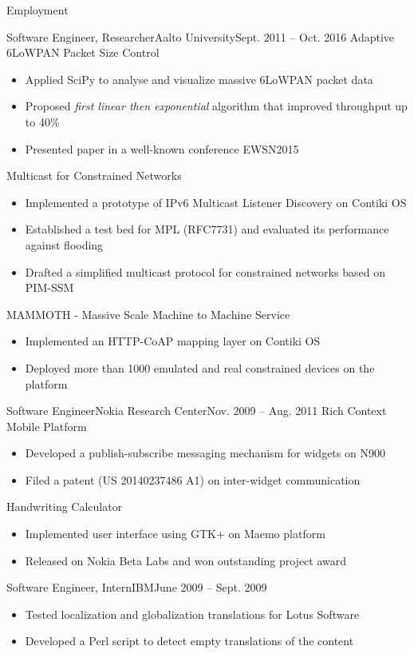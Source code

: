 \documentclass[print]{mcdowellcv}
\begin{document}
\begin{cvsection}{Employment}
		\begin{cvsubsection}{Software Engineer, Researcher}{Aalto University}{Sept. 2011 -- Oct. 2016}
			Adaptive 6LoWPAN Packet Size Control
			\begin{itemize}
				\item Applied SciPy to analyse and visualize massive 6LoWPAN packet data
				\item Proposed \textit{first linear then exponential} algorithm that improved throughput up to 40\%
				\item Presented paper in a well-known conference EWSN2015
			\end{itemize}
			\smallskip
			Multicast for Constrained Networks
			\begin{itemize}
				\item Implemented a prototype of IPv6 Multicast Listener Discovery on Contiki OS
				\item Established a test bed for MPL (RFC7731) and evaluated its performance against flooding 
				\item Drafted a simplified multicast protocol for constrained networks based on PIM-SSM
			\end{itemize}
			\smallskip
			MAMMOTH - Massive Scale Machine to Machine Service
			\begin{itemize}
				\item Implemented an HTTP-CoAP mapping layer on Contiki OS
				\item Deployed more than 1000 emulated and real constrained devices on the platform
			\end{itemize}
		\end{cvsubsection}

		\begin{cvsubsection}{Software Engineer}{Nokia Research Center}{Nov. 2009 -- Aug. 2011}
			Rich Context Mobile Platform
			\begin{itemize}
				\item Developed a publish-subscribe messaging mechanism for widgets on N900
				\item Filed a patent (US 20140237486 A1) on inter-widget communication
			\end{itemize}
			\smallskip
			Handwriting Calculator
			\begin{itemize}
				\item Implemented user interface using GTK+ on Maemo platform
				\item Released on Nokia Beta Labs and won outstanding project award
			\end{itemize}
		\end{cvsubsection}
		
		\begin{cvsubsection}{Software Engineer, Intern}{IBM}{June 2009 -- Sept. 2009}
			\begin{itemize}
				\item Tested localization and globalization translations for Lotus Software
				\item Developed a Perl script to detect empty translations of the content
			\end{itemize}
		\end{cvsubsection}
	\end{cvsection}
\end{document}
